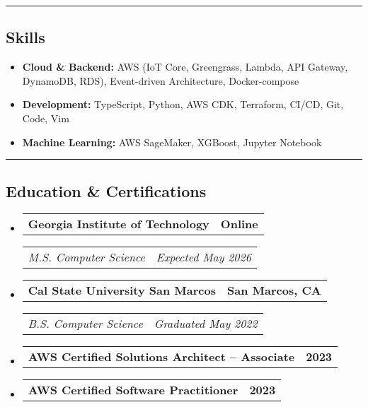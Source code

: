 \documentclass[11pt,letterpaper]{article}
\makeatletter
\newcommand{\headerrow}[2]
{\begin{tabular*}{\linewidth}{l@{\extracolsep{\fill}}r}
#1 &
#2 \\
\end{tabular*}}
\makeatother
\begin{document}
\hrule
\vspace{-1em}
\subsection*{\Large Skills}

\begin{itemize}[leftmargin=1em,noitemsep]
    \item \textbf{Cloud \& Backend:}
          AWS (IoT Core, Greengrass, Lambda, API Gateway, DynamoDB, RDS), Event-driven Architecture, Docker-compose
    \item \textbf{Development:}
          TypeScript, Python, AWS CDK, Terraform, CI/CD, Git, Code, Vim
    \item \textbf{Machine Learning:}
          AWS SageMaker, XGBoost, Jupyter Notebook
\end{itemize}

\hrule
\vspace{-1em}
\subsection*{\Large Education \& Certifications}

\begin{itemize}[leftmargin=1em]
    \parskip=0.1em
        
    \item
        \headerrow
        {\textbf{Georgia Institute of Technology}}
        {\textbf{Online}}
        \headerrow
        {\emph{M.S. Computer Science}}
        {\emph{Expected May 2026}}
        
    \item
        \headerrow
        {\textbf{Cal State University San Marcos}}
        {\textbf{San Marcos, CA}}
        \headerrow
        {\emph{B.S. Computer Science}}
        {\emph{Graduated May 2022}}
        
    \item
        \headerrow
        {\textbf{AWS Certified Solutions Architect -- Associate}}
        {\textbf{2023}}
        
    \item
        \headerrow
        {\textbf{AWS Certified Software Practitioner}}
        {\textbf{2023}}
\end{itemize}
\end{document}
